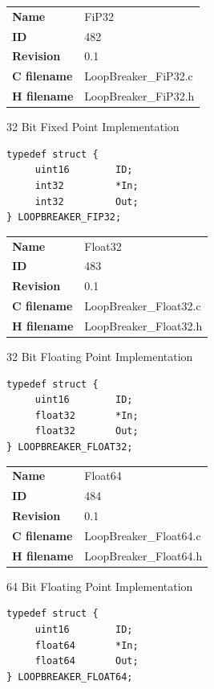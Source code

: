 \ifdefined \AddTestReports
{}
\fi
{}
\nopagebreak[0]
\begin{tabular}{l l}
\textbf{Name} & FiP32 \tabularnewline
\textbf{ID} & 482 \tabularnewline
\textbf{Revision} & 0.1 \tabularnewline
\textbf{C filename} & LoopBreaker\_FiP32.c \tabularnewline
\textbf{H filename} & LoopBreaker\_FiP32.h \tabularnewline
\end{tabular}
\vspace{1ex}

32 Bit Fixed Point Implementation

\begin{lstlisting}
typedef struct {
     uint16        ID;
     int32         *In;
     int32         Out;
} LOOPBREAKER_FIP32;
\end{lstlisting}

\ifdefined \AddTestReports
{}
\fi
{}
\nopagebreak[0]
\begin{tabular}{l l}
\textbf{Name} & Float32 \tabularnewline
\textbf{ID} & 483 \tabularnewline
\textbf{Revision} & 0.1 \tabularnewline
\textbf{C filename} & LoopBreaker\_Float32.c \tabularnewline
\textbf{H filename} & LoopBreaker\_Float32.h \tabularnewline
\end{tabular}
\vspace{1ex}

32 Bit Floating Point Implementation

\begin{lstlisting}
typedef struct {
     uint16        ID;
     float32       *In;
     float32       Out;
} LOOPBREAKER_FLOAT32;
\end{lstlisting}

\ifdefined \AddTestReports
{}
\fi
{}
\nopagebreak[0]
\begin{tabular}{l l}
\textbf{Name} & Float64 \tabularnewline
\textbf{ID} & 484 \tabularnewline
\textbf{Revision} & 0.1 \tabularnewline
\textbf{C filename} & LoopBreaker\_Float64.c \tabularnewline
\textbf{H filename} & LoopBreaker\_Float64.h \tabularnewline
\end{tabular}
\vspace{1ex}

64 Bit Floating Point Implementation

\begin{lstlisting}
typedef struct {
     uint16        ID;
     float64       *In;
     float64       Out;
} LOOPBREAKER_FLOAT64;
\end{lstlisting}

\ifdefined \AddTestReports
{}
\fi
